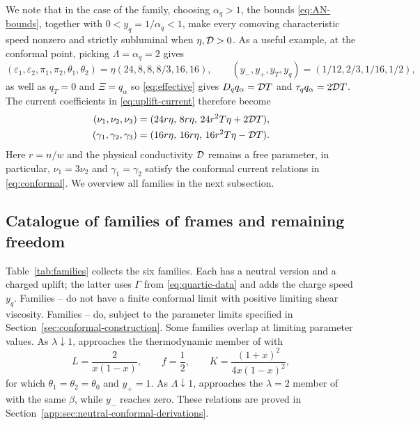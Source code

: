 We note that in the case of the  family, choosing $\alpha_q>1$, the bounds \eqref{eq:AN-bounds}, together with
$0<y_q=1/\alpha_q<1$, make every comoving characteristic speed nonzero
and strictly subluminal when $\eta,\mathcal D>0$. As a useful example, at the conformal point, picking $\Lambda=\alpha_q=2$ gives
\begin{equation}\label{eq:benchmark}
 (\varepsilon_1,\varepsilon_2,\pi_1,\pi_2,\theta_1,\theta_2)
 =\eta(24,8,8,8/3,16,16),\qquad
 (y_-,y_+,y_T,y_q)=(1/12,2/3,1/16,1/2),
\end{equation}
as well as $q_T=0$ and $\Xi=q_\alpha$ so
\eqref{eq:effective} gives $D_qq_\alpha=\mathcal D T$ and
$\tau_qq_\alpha=2\mathcal D T$. The current coefficients in
\eqref{eq:uplift-current} therefore become
\begin{align}
 (\nu_1,\nu_2,\nu_3)
   &=(24r\eta,\,8r\eta,\,24r^2T\eta+2\mathcal D T),\nonumber\\
 (\gamma_1,\gamma_2,\gamma_3)
   &=(16r\eta,\,16r\eta,\,16r^2T\eta-\mathcal D T).
 \label{eq:benchmark-current}
\end{align}
Here $r=n/w$ and the physical conductivity $\mathcal D$ remains a free parameter, in particular, $\nu_1=3\nu_2$ and $\gamma_1=\gamma_2$
satisfy the conformal current relations in \eqref{eq:conformal}. We overview all families in the next subsection.

\subsection{Catalogue of families of frames and remaining freedom}\label{sec:catalogue}
Table~\ref{tab:families} collects the six families. Each has a neutral
version and a charged uplift; the latter uses $\Gamma$ from
\eqref{eq:quartic-data} and adds the charge speed $y_q$.
Families -- do not have a finite conformal limit
with positive limiting shear viscosity. Families --
do, subject to the parameter limits specified in
Section~\ref{sec:conformal-construction}.
Some families overlap at limiting parameter values. As $\lambda\downarrow1$,
 approaches the thermodynamic member of  with
\begin{equation}\label{eq:AG-equal-vector}
 L=\frac{2}{x(1-x)},\qquad f=\frac12,\qquad
 K=\frac{(1+x)^2}{4x(1-x)^2},
\end{equation}
for which $\theta_1=\theta_2=\theta_0$ and $y_+=1$.
As $\Lambda\downarrow1$,  approaches the $\lambda=2$ member
of  with the same $\beta$, while $y_-$ reaches zero.
These relations are proved in Section~\ref{app:sec:neutral-conformal-derivations}.

